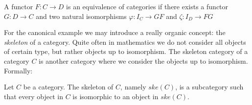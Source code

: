 \begin{definition}
  A functor $F:C\to D$ is an equivalence of categories if there exists a functor $G:D\to C$  and two natural isomorphisms $\varphi: I_C \to GF$ and $\zeta: I_D\to FG$
\end{definition}


For the canonical example we may introduce a really organic concept: the \emph{skeleton} of a category. Quite often in mathematics we do not consider all objects of certain type, but rather objects up to isomorphism. The skeleton category of a category $C$ is another category where we consider the objects up to isomorphism. Formally:
\begin{definition}
  Let $C$ be a category. The skeleton of $C$, namely $ske(C)$, is a subcategory  such that every object in $C$ is isomorphic to an object in $ske(C)$.
\end{definition}

